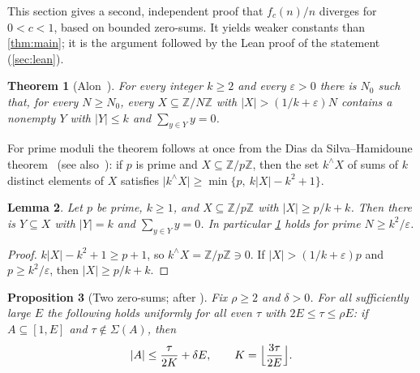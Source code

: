 \documentclass[11pt,reqno]{amsart}
\numberwithin{equation}{section}
\newtheorem{theorem}{Theorem}[section]
\newtheorem{proposition}[theorem]{Proposition}
\newtheorem{lemma}[theorem]{Lemma}
\theoremstyle{definition}
\theoremstyle{remark}
\newcommand{\Z}{\mathbb{Z}}
\newcommand{\eps}{\varepsilon}
\newcommand{\card}[1]{\lvert #1\rvert}
\newcommand{\Sig}{\Sigma}
\newcommand{\lean}[1]{\texttt{\detokenize{#1}}}
\begin{document}
This section gives a second, independent proof that $f_c(n)/n$ diverges for $0<c<1$, based on bounded zero-sums. It yields weaker constants than \cref{thm:main}; it is the argument followed by the Lean proof of the statement \lean{erdos361_irregular} (\cref{sec:lean}).

\begin{theorem}[Alon~{\cite[Theorem~1.1]{Al87}}]\label{thm:alon}
For every integer $k\ge2$ and every $\eps>0$ there is $N_0$ such that, for every $N\ge N_0$, every $X\subseteq\Z/N\Z$ with $\card X>(1/k+\eps)N$ contains a nonempty $Y$ with $\card Y\le k$ and $\sum_{y\in Y}y=0$.
\end{theorem}

For prime moduli the theorem follows at once from the Dias da Silva--Hamidoune theorem~\cite{DSH94} (see also~\cite{ANR96}): if $p$ is prime and $X\subseteq\Z/p\Z$, then the set $k^\wedge X$ of sums of $k$ distinct elements of $X$ satisfies $\card{k^\wedge X}\ge\min\{p,\ k\card X-k^2+1\}$.

\begin{lemma}\label{lem:dsh}
Let $p$ be prime, $k\ge1$, and $X\subseteq\Z/p\Z$ with $\card X\ge p/k+k$. Then there is $Y\subseteq X$ with $\card Y=k$ and $\sum_{y\in Y}y=0$. In particular \cref{thm:alon} holds for prime $N\ge k^2/\eps$.
\end{lemma}

\begin{proof}
$k\card X-k^2+1\ge p+1$, so $k^\wedge X=\Z/p\Z\ni0$. If $\card X>(1/k+\eps)p$ and $p\ge k^2/\eps$, then $\card X\ge p/k+k$.
\end{proof}

\begin{proposition}[Two zero-sums; after {\cite[Corollary~2.6]{Al87}}]\label{prop:twozero}
Fix $\rho\ge2$ and $\delta>0$. For all sufficiently large $E$ the following holds uniformly for all even $\tau$ with $2E\le\tau\le\rho E$: if $A\subseteq[1,E]$ and $\tau\notin\Sig(A)$, then
\[
 \card A\le\frac{\tau}{2K}+\delta E,\qquad K=\Bigl\lfloor\frac{3\tau}{2E}\Bigr\rfloor .
\]
\end{proposition}
\end{document}
